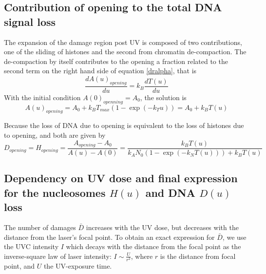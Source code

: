 \documentclass[12pt]{article}
\begin{document}
\subsection{Contribution of opening to the total DNA signal loss}

The expansion of the damage region post UV is composed of two contributions, one of the sliding of histones and the second from chromatin de-compaction.
The de-compaction by itself contributes to the opening a fraction related to the second term on the right hand side of equation \ref{dralpha}, that is 
\begin{equation}
\frac{dA(u)_{opening}}{du}=k_B\frac{dT(u)}{du}
\end{equation}
With the initial condition $A(0)_{openning}=A_0$, the solution is 
\begin{equation}
A(u)_{opening}= A_0+k_BT_{max}(1-\exp(-k_Tu))=A_0+k_BT(u)
\end{equation}

Because the loss of DNA due to opening is equivalent to the loss of histones due to opening, and both are given by 
\begin{equation}
D_{opening}=H_{opening}=\frac{A_{opening}-A_0}{A(u)-A(0)}=\frac{k_BT(u)}{k_AN_0(1-\exp(-k_NT(u)))+k_BT(u)}
\end{equation}

\subsection{Dependency on UV dose and final expression for the nucleosomes $H(u)$ and DNA $D(u)$ loss}

The number of damages $\bar{D}$ increases with the UV dose, but decreases with the distance from the laser's focal point. To obtain an exact expression for $\bar{D}$, we use the UVC intensity $I$ which decays with the distance from the focal point as the inverse-square law of laser intensity: $I \sim \frac{U}{r^2}$, where $r$ is the distance from focal point, and $U$ the UV-exposure time.
\end{document}

